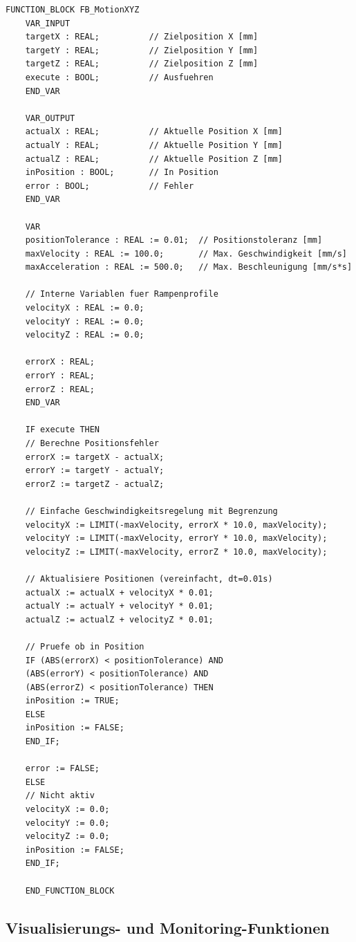 ﻿\documentclass[12pt,a4paper]{article}
\begin{document}
\begin{lstlisting}[style=structuredtext, caption={Funktionsbaustein für XYZ-Bewegungssteuerung}, label={lst:motion}]
	FUNCTION_BLOCK FB_MotionXYZ
	VAR_INPUT
	targetX : REAL;          // Zielposition X [mm]
	targetY : REAL;          // Zielposition Y [mm]
	targetZ : REAL;          // Zielposition Z [mm]
	execute : BOOL;          // Ausfuehren
	END_VAR
	
	VAR_OUTPUT
	actualX : REAL;          // Aktuelle Position X [mm]
	actualY : REAL;          // Aktuelle Position Y [mm]
	actualZ : REAL;          // Aktuelle Position Z [mm]
	inPosition : BOOL;       // In Position
	error : BOOL;            // Fehler
	END_VAR
	
	VAR
	positionTolerance : REAL := 0.01;  // Positionstoleranz [mm]
	maxVelocity : REAL := 100.0;       // Max. Geschwindigkeit [mm/s]
	maxAcceleration : REAL := 500.0;   // Max. Beschleunigung [mm/s*s]
	
	// Interne Variablen fuer Rampenprofile
	velocityX : REAL := 0.0;
	velocityY : REAL := 0.0;
	velocityZ : REAL := 0.0;
	
	errorX : REAL;
	errorY : REAL;
	errorZ : REAL;
	END_VAR
	
	IF execute THEN
	// Berechne Positionsfehler
	errorX := targetX - actualX;
	errorY := targetY - actualY;
	errorZ := targetZ - actualZ;
	
	// Einfache Geschwindigkeitsregelung mit Begrenzung
	velocityX := LIMIT(-maxVelocity, errorX * 10.0, maxVelocity);
	velocityY := LIMIT(-maxVelocity, errorY * 10.0, maxVelocity);
	velocityZ := LIMIT(-maxVelocity, errorZ * 10.0, maxVelocity);
	
	// Aktualisiere Positionen (vereinfacht, dt=0.01s)
	actualX := actualX + velocityX * 0.01;
	actualY := actualY + velocityY * 0.01;
	actualZ := actualZ + velocityZ * 0.01;
	
	// Pruefe ob in Position
	IF (ABS(errorX) < positionTolerance) AND 
	(ABS(errorY) < positionTolerance) AND 
	(ABS(errorZ) < positionTolerance) THEN
	inPosition := TRUE;
	ELSE
	inPosition := FALSE;
	END_IF;
	
	error := FALSE;
	ELSE
	// Nicht aktiv
	velocityX := 0.0;
	velocityY := 0.0;
	velocityZ := 0.0;
	inPosition := FALSE;
	END_IF;
	
	END_FUNCTION_BLOCK
\end{lstlisting}

\subsection{Visualisierungs- und Monitoring-Funktionen}
\end{document}
